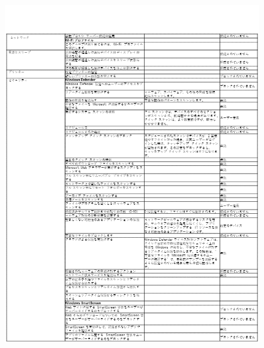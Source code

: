 \begin{figure}[htbp]
    \centering
    \vspace{-1.5cm}
    \includegraphics[width=17cm]{figures/IntuneforEducation-03.png}
\end{figure}

